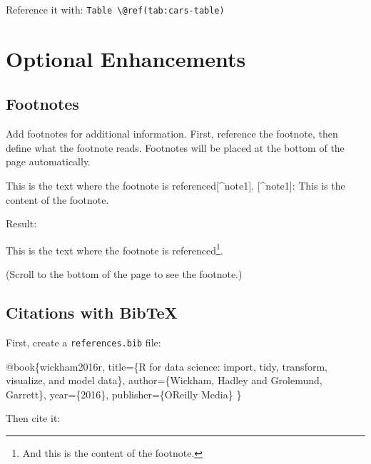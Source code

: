 \documentclass[
]{book}
\newenvironment{Shaded}{\begin{snugshade}}{\end{snugshade}}
\newcommand{\DataTypeTok}[1]{\textcolor[rgb]{0.13,0.29,0.53}{#1}}
\newcommand{\NormalTok}[1]{#1}
\newcommand{\OtherTok}[1]{\textcolor[rgb]{0.56,0.35,0.01}{#1}}
\newcommand{\VariableTok}[1]{\textcolor[rgb]{0.00,0.00,0.00}{#1}}
\begin{document}
Reference it with: \texttt{Table\ \textbackslash{}@ref(tab:cars-table)}

\section{Optional Enhancements}\label{optional-enhancements}

\subsection{Footnotes}\label{footnotes}

Add footnotes for additional information. First, reference the footnote, then define what the footnote reads.
Footnotes will be placed at the bottom of the page automatically.

\begin{Shaded}
\begin{Highlighting}[]
\NormalTok{This is the text where the footnote is referenced}\OtherTok{[\^{}note1]}\NormalTok{.}
\OtherTok{[\^{}note1]: }\NormalTok{This is the content of the footnote.}
\end{Highlighting}
\end{Shaded}

Result:

This is the text where the footnote is referenced\footnote{And this is the content of the footnote.}.

(Scroll to the bottom of the page to see the footnote.)

\subsection{Citations with BibTeX}\label{citations-with-bibtex}

First, create a \texttt{references.bib} file:

\begin{Shaded}
\begin{Highlighting}[]
\VariableTok{@book}\NormalTok{\{}\OtherTok{wickham2016r}\NormalTok{,}
  \DataTypeTok{title}\NormalTok{=\{R for data science: import, tidy, transform, visualize, and model data\},}
  \DataTypeTok{author}\NormalTok{=\{Wickham, Hadley and Grolemund, Garrett\},}
  \DataTypeTok{year}\NormalTok{=\{2016\},}
  \DataTypeTok{publisher}\NormalTok{=\{O\textquotesingle{}Reilly Media\}}
\NormalTok{\}}
\end{Highlighting}
\end{Shaded}

Then cite it:
\end{document}
